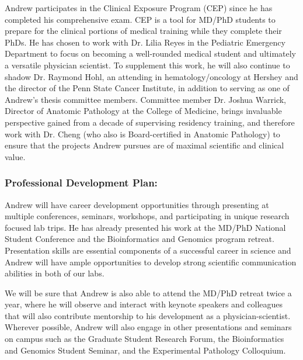 \documentclass{NIHGrant}
\begin{document}
Andrew participates in the Clinical Exposure Program (CEP) since he has completed his comprehensive exam. CEP is a tool for MD/PhD students to prepare for the clinical portions of medical training while they complete their PhDs. He has chosen to work with Dr. Lilia Reyes in the Pediatric Emergency Department to focus on becoming a well-rounded medical student and ultimately a versatile physician scientist. To supplement this work, he will also continue to shadow Dr. Raymond Hohl, an attending in hematology/oncology at Hershey and the director of the Penn State Cancer Institute, in addition to serving as one of Andrew's thesis committee members. Committee member Dr. Joshua Warrick, Director of Anatomic Pathology at the College of Medicine, brings invaluable perspective gained from a decade of supervising residency training, and therefore work with Dr. Cheng (who also is Board-certified in Anatomic Pathology) to ensure that the projects Andrew pursues are of maximal scientific and clinical value. 

\subsubsection*{Professional Development Plan: }
Andrew will have career development opportunities through presenting at multiple conferences, seminars, workshops, and participating in unique research focused lab trips. He has already presented his work at the MD/PhD National Student Conference and the Bioinformatics and Genomics program retreat. Presentation skills are essential components of a successful career in science and Andrew will have ample opportunities to develop strong scientific communication abilities in both of our labs.

We will be sure that Andrew is also able to attend the MD/PhD retreat twice a year, where he will observe and interact with keynote speakers and colleagues that will also contribute mentorship to his development as a physician-scientist. Wherever possible, Andrew will also engage in other presentations and seminars on campus such as the Graduate Student Research Forum, the Bioinformatics and Genomics Student Seminar, and the Experimental Pathology Colloquium.

\end{document}
